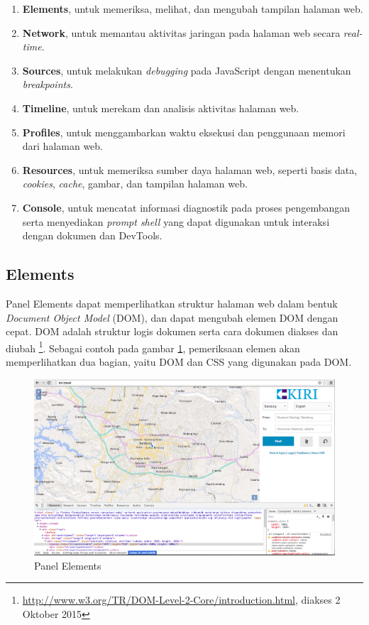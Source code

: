 \begin{enumerate}
	\item \textbf{Elements}, untuk memeriksa, melihat, dan mengubah tampilan halaman web.
	\item \textbf{Network}, untuk memantau aktivitas jaringan pada halaman web secara \textit{real-time}.
	\item \textbf{Sources}, untuk melakukan \textit{debugging} pada JavaScript dengan menentukan \textit{breakpoints}.
	\item \textbf{Timeline}, untuk merekam dan analisis aktivitas halaman web.
	\item \textbf{Profiles}, untuk menggambarkan waktu eksekusi dan penggunaan memori dari halaman web.
	\item \textbf{Resources}, untuk memeriksa sumber daya halaman web, seperti basis data, \textit{cookies}, \textit{cache}, gambar, dan tampilan halaman web.
	\item \textbf{Console}, untuk mencatat informasi diagnostik pada proses pengembangan serta menyediakan \textit{prompt shell} yang dapat digunakan untuk interaksi dengan dokumen dan DevTools.
\end{enumerate}

\subsection{Elements}
Panel Elements dapat memperlihatkan struktur halaman web dalam bentuk \textit{Document Object Model} (DOM), dan dapat mengubah elemen DOM dengan cepat. DOM adalah struktur logis dokumen serta cara dokumen diakses dan diubah \footnote{\url{http://www.w3.org/TR/DOM-Level-2-Core/introduction.html}, diakses 2 Oktober 2015}. Sebagai contoh pada gambar \ref{fig:2_devtools_elements}, pemeriksaan elemen akan memperlihatkan dua bagian, yaitu DOM dan CSS yang digunakan pada DOM.

\begin{figure}[H]
	\centering
	\includegraphics[scale=0.3]{Gambar/devtools-elements}
	\caption{Panel Elements} 
	\label{fig:2_devtools_elements}
\end{figure}

